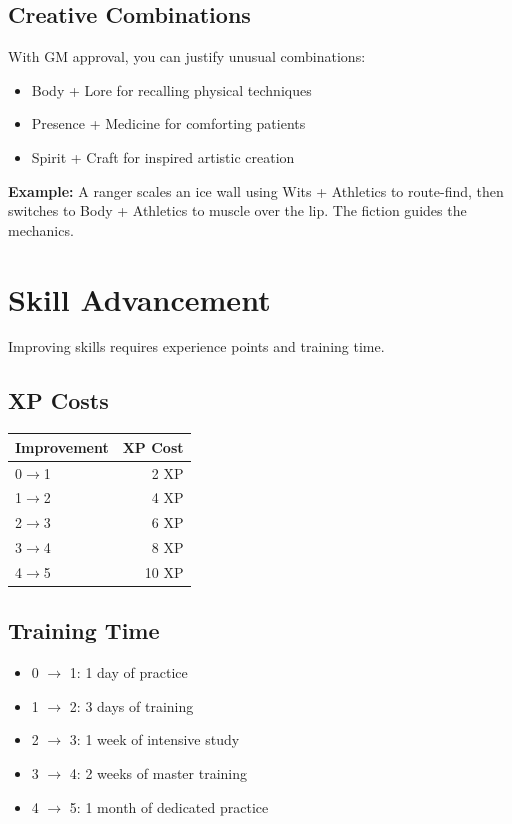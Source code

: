 \documentclass[11pt,twoside,openany]{book}
\begin{document}
\subsection*{Creative Combinations}

With GM approval, you can justify unusual combinations:
\begin{itemize}
\item Body + Lore for recalling physical techniques
\item Presence + Medicine for comforting patients
\item Spirit + Craft for inspired artistic creation
\end{itemize}

\textbf{Example:} A ranger scales an ice wall using Wits + Athletics to route-find, then switches to Body + Athletics to muscle over the lip. The fiction guides the mechanics.

\section*{Skill Advancement} 

Improving skills requires experience points and training time.

\subsection*{XP Costs}

\begin{center}
\begin{tabular}{|l|r|}
\hline
\textbf{Improvement} & \textbf{XP Cost} \\
\hline
0$\rightarrow$1 & 2 XP \\
1$\rightarrow$2 & 4 XP \\
2$\rightarrow$3 & 6 XP \\
3$\rightarrow$4 & 8 XP \\
4$\rightarrow$5 & 10 XP \\
\hline
\end{tabular}
\end{center}

\subsection*{Training Time}

\begin{itemize}
\item 0 $\rightarrow$ 1: 1 day of practice
\item 1 $\rightarrow$ 2: 3 days of training
\item 2 $\rightarrow$ 3: 1 week of intensive study
\item 3 $\rightarrow$ 4: 2 weeks of master training
\item 4 $\rightarrow$ 5: 1 month of dedicated practice
\end{itemize}
\end{document}
